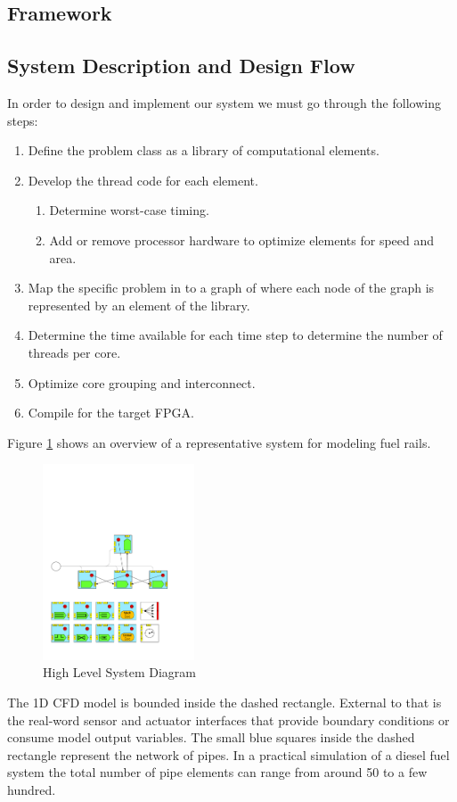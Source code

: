 \subsection{Framework}
\subsection{System Description and Design Flow}

In order to design and implement our system we must go through the following steps:
\begin{enumerate}
	\item Define the problem class as a library of computational elements.
	\item Develop the thread code for each element.
	\begin{enumerate}
		\item Determine worst-case timing.
		\item Add or remove processor hardware to optimize elements for speed and area.
	\end{enumerate}
	\item Map the specific problem in to a graph of where each node of the graph is represented by an element of the library.
	\item Determine the time available for each time step to determine the number of threads per core.
	\item Optimize core grouping and interconnect.
	\item Compile for the target FPGA.
\end{enumerate}

Figure \ref{HighLevelDiagram} shows an overview of a representative system for modeling fuel rails.  
%
\begin{figure}
\centering
\includegraphics[page=7, width=0.4\textwidth]{./figs/1dcfd/ElementalProcessors.pdf}
\caption{High Level System Diagram}
\label{HighLevelDiagram}
\end{figure}
%
The 1D CFD model is bounded inside the dashed rectangle.  
External to that is the real-word sensor and actuator interfaces that provide boundary conditions or consume model output variables.  
The small blue squares inside the dashed rectangle represent the network of pipes.  
In a practical simulation of a diesel fuel system the total number of pipe elements can range from around 50 to a few hundred.  

